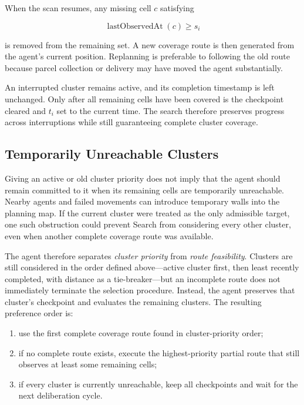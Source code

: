 \documentclass[a4paper]{article}
\begin{document}
When the scan resumes, any missing cell $c$ satisfying

\[
    \operatorname{lastObservedAt}(c) \geq s_i
\]

is removed from the remaining set. A new coverage route is then generated from
the agent's current position. Replanning is preferable to following the old
route because parcel collection or delivery may have moved the agent
substantially.

An interrupted cluster remains active, and its completion timestamp is left
unchanged. Only after all remaining cells have been covered is the checkpoint
cleared and $t_i$ set to the current time. The search therefore preserves
progress across interruptions while still guaranteeing complete cluster
coverage.

\subsection{Temporarily Unreachable Clusters}

Giving an active or old cluster priority does not imply that the agent should
remain committed to it when its remaining cells are temporarily unreachable.
Nearby agents and failed movements can introduce temporary walls into the
planning map. If the current cluster were treated as the only admissible
target, one such obstruction could prevent Search from considering every other
cluster, even when another complete coverage route was available.

The agent therefore separates \emph{cluster priority} from
\emph{route feasibility}. Clusters are still considered in the order defined
above---active cluster first, then least recently completed, with distance as
a tie-breaker---but an incomplete route does not immediately terminate the
selection procedure. Instead, the agent preserves that cluster's checkpoint
and evaluates the remaining clusters. The resulting preference order is:

\begin{enumerate}
    \item use the first complete coverage route found in cluster-priority
    order;
    \item if no complete route exists, execute the highest-priority partial
    route that still observes at least some remaining cells;
    \item if every cluster is currently unreachable, keep all checkpoints and
    wait for the next deliberation cycle.
\end{enumerate}
\end{document}
